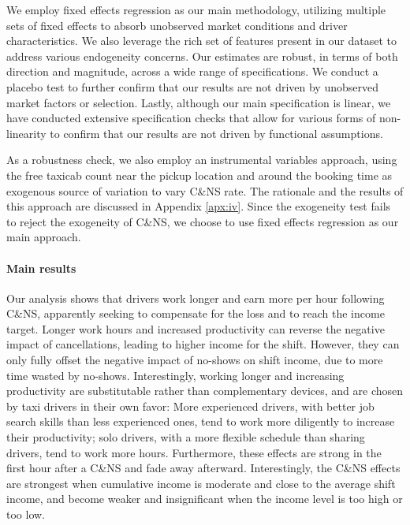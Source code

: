 \documentclass[reviewmode]{restat}
\begin{document}
We employ fixed effects regression as our main methodology, utilizing multiple sets of fixed effects 
to absorb unobserved market conditions and driver characteristics. We also leverage the rich set of 
features present in our dataset to address various endogeneity concerns. Our estimates are robust, 
in terms of both direction and magnitude, across a wide range of specifications. We conduct a placebo 
test to further confirm that our results are not driven by unobserved market factors or selection. Lastly, 
although our main specification is linear, we have conducted extensive specification checks that allow for
various forms of non-linearity to confirm that our results are not driven by functional assumptions.

As a robustness check, we also employ an instrumental variables approach, using the free taxicab count near 
the pickup location and around the booking time as exogenous source of variation to vary C\&NS rate.
The rationale and the results of this approach are discussed in Appendix \ref{apx:iv}. 
Since the exogeneity test fails to reject the exogeneity of C\&NS, 
we choose to use fixed effects regression as our main approach.


\paragraph{Main results} Our analysis shows that drivers work longer and earn more per hour following 
C\&NS, apparently seeking to compensate for the loss and to reach the income target. Longer work hours 
and increased productivity can reverse the negative impact of cancellations, leading to higher income 
for the shift. However, they can only fully offset the negative impact of no-shows on shift income, 
due to more time wasted by no-shows. Interestingly, working longer and increasing productivity are 
substitutable rather than complementary devices, and are chosen by taxi drivers in their own favor: 
More experienced drivers, with better job search skills than less experienced ones, tend to work more 
diligently to increase their productivity; solo drivers, with a more flexible schedule than sharing 
drivers, tend to work more hours. Furthermore, these effects are strong in the first hour after a 
C\&NS and fade away afterward. Interestingly, the C\&NS effects are strongest when cumulative income 
is moderate and close to the average shift income, and become weaker and insignificant when the income 
level is too high or too low. 
\end{document}
